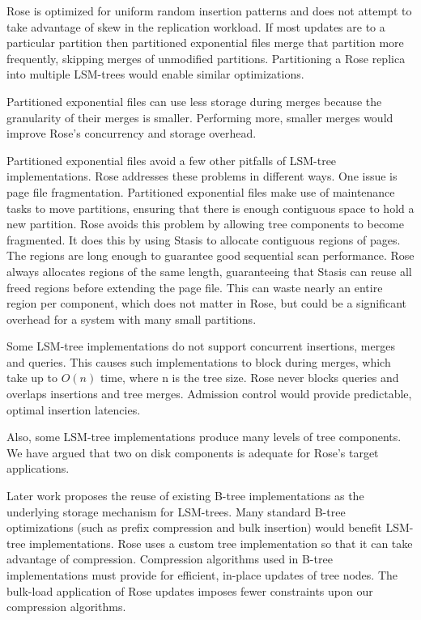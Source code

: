 \documentclass{vldb}
\newcommand{\rows}{Rose\xspace}
\newcommand{\rowss}{Rose's\xspace}
\begin{document}
\rows is optimized for uniform random insertion patterns
and does not attempt to take advantage of skew in the replication
workload.  If most updates are to a particular partition then
partitioned exponential files merge that partition more frequently,
skipping merges of unmodified partitions.  Partitioning a \rows
replica into multiple LSM-trees would enable similar optimizations.

Partitioned exponential files can use less storage during merges
because the granularity of their merges is smaller.  Performing more,
smaller merges would improve \rowss concurrency and storage overhead.

Partitioned exponential files avoid a few other pitfalls of LSM-tree
implementations.  \rows addresses these problems in different ways.
One issue is page file fragmentation.  Partitioned exponential files
make use of maintenance tasks to move partitions, ensuring that there
is enough contiguous space to hold a new partition.  \rows avoids this
problem by allowing tree components to become fragmented.  It does
this by using Stasis to allocate contiguous regions of pages.  The
regions are long enough to guarantee good sequential scan performance.
\rows always allocates regions of the same length, guaranteeing that
Stasis can reuse all freed regions before extending the page file.
This can waste nearly an entire region per component, which does not
matter in \rows, but could be a significant overhead for a system with
many small partitions.

Some LSM-tree implementations do not support concurrent insertions,
merges and queries.  This causes such implementations to block during
merges, which take up to $O(n)$ time, where n is the tree size.
\rows never blocks queries and overlaps insertions and tree merges.
Admission control would provide predictable, optimal insertion
latencies.

Also, some LSM-tree implementations produce many levels of
tree components.  We have argued that two on disk components is
adequate for \rowss target applications.

Later work proposes the reuse of existing B-tree implementations as
the underlying storage mechanism for LSM-trees\cite{cidrPartitionedBTree}.  Many
standard B-tree optimizations (such as prefix compression and bulk insertion)
would benefit LSM-tree implementations.  \rows uses a custom tree
implementation so that it can take advantage of compression.
Compression algorithms used in B-tree implementations must provide for
efficient, in-place updates of tree nodes.  The bulk-load application of
\rows updates imposes fewer constraints upon our compression
algorithms.
\end{document}
